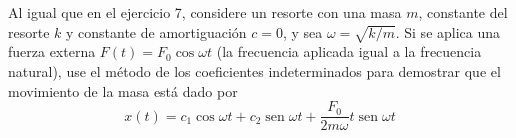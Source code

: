 \item Al igual que en el ejercicio 7, considere un resorte con una masa $m$, constante del resorte $k$ y constante de amortiguación $c = 0$, y sea $\omega = \sqrt{k/m}$. Si se aplica una fuerza externa $F(t) = F_0 \cos \omega t$ (la frecuencia aplicada igual a la frecuencia natural), use el método de los coeficientes indeterminados para demostrar que el movimiento de la masa está dado por
    \[ x(t) = c_1 \cos \omega t + c_2 \operatorname{sen} \omega t + \frac{F_0}{2m\omega} t \operatorname{sen} \omega t \]
